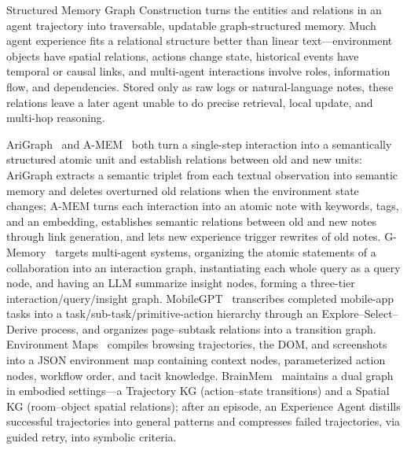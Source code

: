 Structured Memory Graph Construction turns the entities and relations in an agent trajectory into traversable, updatable graph-structured memory. Much agent experience fits a relational structure better than linear text---environment objects have spatial relations, actions change state, historical events have temporal or causal links, and multi-agent interactions involve roles, information flow, and dependencies. Stored only as raw logs or natural-language notes, these relations leave a later agent unable to do precise retrieval, local update, and multi-hop reasoning.

AriGraph~\cite{Ano24} and A-MEM~\cite{Xu25b} both turn a single-step interaction into a semantically structured atomic unit and establish relations between old and new units: AriGraph extracts a semantic triplet from each textual observation into semantic memory and deletes overturned old relations when the environment state changes; A-MEM turns each interaction into an atomic note with keywords, tags, and an embedding, establishes semantic relations between old and new notes through link generation, and lets new experience trigger rewrites of old notes. G-Memory~\cite{Zha25} targets multi-agent systems, organizing the atomic statements of a collaboration into an interaction graph, instantiating each whole query as a query node, and having an LLM summarize insight nodes, forming a three-tier interaction/query/insight graph. MobileGPT~\cite{Lee23} transcribes completed mobile-app tasks into a task/sub-task/primitive-action hierarchy through an Explore--Select--Derive process, and organizes page--subtask relations into a transition graph. Environment Maps~\cite{Fen26} compiles browsing trajectories, the DOM, and screenshots into a JSON environment map containing context nodes, parameterized action nodes, workflow order, and tacit knowledge. BrainMem~\cite{Ma26} maintains a dual graph in embodied settings---a Trajectory KG (action--state transitions) and a Spatial KG (room--object spatial relations); after an episode, an Experience Agent distills successful trajectories into general patterns and compresses failed trajectories, via guided retry, into symbolic criteria.

